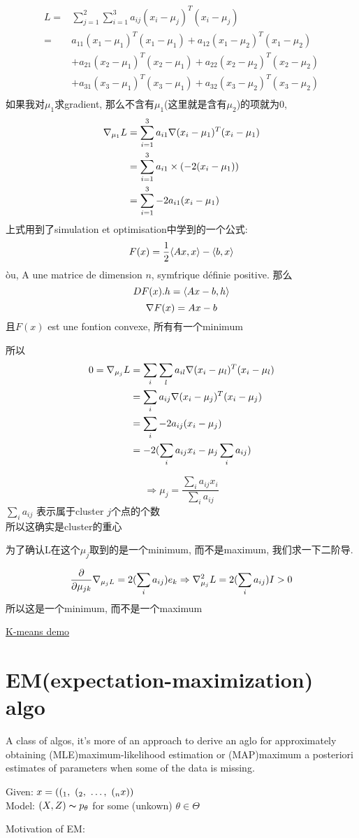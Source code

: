 \documentclass{article}
\begin{document}
$$
\begin{aligned}
L
= & \sum_{j = 1}^2 \sum_{i=1}^3 a_{ij}(x_i - \mu_j)^T (x_i - \mu_j) \\
= &  a_{11}(x_1 - \mu_1)^T (x_1 - \mu_1) + a_{12}(x_1 - \mu_2)^T (x_1 - \mu_2) \\
& + a_{21}(x_2 - \mu_1)^T (x_2 - \mu_1) + a_{22}(x_2 - \mu_2)^T (x_2 - \mu_2) \\
& + a_{31}(x_3 - \mu_1)^T (x_3 - \mu_1) + a_{32}(x_3 - \mu_2)^T (x_3 - \mu_2) \\
\end{aligned}
$$
如果我对$\mu_1$求gradient, 那么不含有$\mu_1$(这里就是含有$\mu_2$)的项就为0,
$$
\begin{aligned}
\nabla _{\mu_1}{L}
& = \sum_{i = 1}^3 a_{i1}\nabla (x_i - \mu_1)^T (x_i - \mu_1) \\
& = \sum_{i = 1}^3 a_{i1} \times (-2(x_i - \mu_1)) \\
& = \sum_{i = 1}^3  -2a_{i1}(x_i - \mu_1) \\
\end{aligned}
$$
上式用到了simulation et optimisation中学到的一个公式:
$$
F(x)= \frac{1}{2} \langle Ax , x\rangle - \langle b , x\rangle
$$
\`ou, A une matrice de dimension $n$, sym\'trique d\'efinie positive. 那么
$$DF(x).h = \langle Ax - b , h\rangle$$
$$\nabla F(x) = Ax - b$$
且$F(x)$ est une fontion convexe, 所有有一个minimum

所以
$$
\begin{aligned}
0 = \nabla _{\mu_j}{L}
&= \sum_i \sum_l a_{il} \nabla (x_i - \mu_l)^T (x_i - \mu_l) \\
&= \sum_i a_{ij} \nabla (x_i - \mu_j)^T (x_i - \mu_j) \\
&= \sum_i -2a_{ij} (x_i - \mu_j) \\
&= -2(\sum_i a_{ij}x_i - \mu_j \sum_i a_{ij})
\end{aligned}
$$

$$
\Rightarrow
\mu_j = \dfrac{\sum_i a_{ij}x_i}{\sum_i a_{ij}}
$$
$\sum_i a_{ij}$  表示属于cluster $j$个点的个数\\
所以这确实是cluster的重心

为了确认L在这个$\mu_j$取到的是一个minimum, 而不是maximum, 我们求一下二阶导.

$$
\frac{\partial }{\partial \mu_{jk}} \nabla _{\mu_{j} L}
= 2(\sum_i a_{ij}) e_k
\Rightarrow
\nabla ^2_{\mu_j} L = 2(\sum_i a_{ij})I > 0
$$
所以这是一个minimum, 而不是一个maximum

\href{https://www.youtube.com/watch?v=zHbxbb2ye3E}{K-means demo}

\section{EM(expectation-maximization) algo}
A class of algos,
it's more of an approach to derive an aglo for approximately obtaining (MLE)maximum-likelihood estimation or (MAP)maximum a posteriori estimates of parameters
when some of the data is missing.

Given: $x = ((_1,~(_2,~\ldots,~(_nx))$\\
Model: $(X, Z) \thicksim{p}_\theta$ for some (unkown) $\theta \in \Theta$

Motivation of EM:
\end{document}
